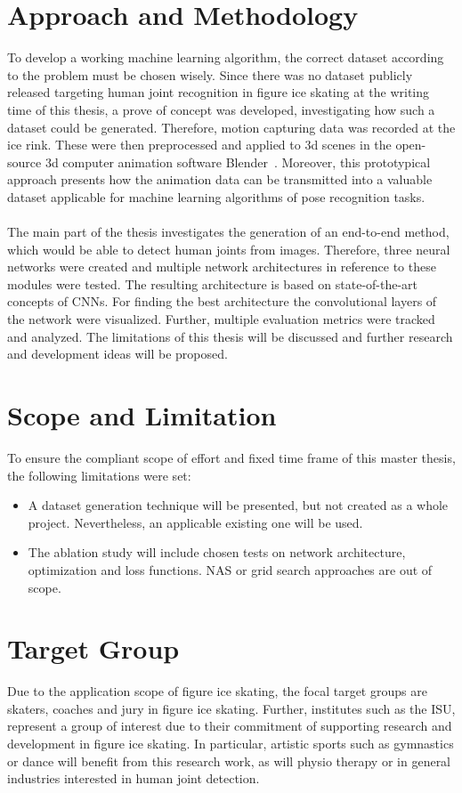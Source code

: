 \section{Approach and Methodology}
To develop a working machine learning algorithm, the correct dataset according to the problem must be chosen wisely.
Since there was no dataset publicly released targeting human joint recognition in figure ice skating at the writing time
of this thesis, a prove of concept was developed, investigating how such a dataset could be generated.
Therefore, motion capturing data was recorded at the ice rink.
These were then preprocessed and applied to 3d scenes in the open-source 3d computer animation software Blender~\cite{blender}.
Moreover, this prototypical approach presents how the animation data can be transmitted into a valuable dataset applicable for machine learning
algorithms of pose recognition tasks.
\\\mbox{}\\
The main part of the thesis investigates the generation of an end-to-end method, which would be able to detect human joints
from images.
Therefore, three neural networks were created and multiple network architectures in reference to these modules were tested.
The resulting architecture is based on state-of-the-art concepts of \glspl{CNN}.
For finding the best architecture the convolutional layers of the network were visualized.
Further, multiple evaluation metrics were tracked and analyzed.
The limitations of this thesis will be discussed and further research and development ideas will be proposed.



\section{Scope and Limitation}
\label{limitations}
To ensure the compliant scope of effort and fixed time frame of this master thesis, the following limitations were set:

\begin{itemize}
    \item A dataset generation technique will be presented, but not created as a whole project.
    Nevertheless, an applicable existing one will be used.
    \item The ablation study will include chosen tests on network architecture, optimization and loss functions.
    \gls{NAS} or grid search approaches are out of scope.
\end{itemize}
\section{Target Group}
Due to the application scope of figure ice skating, the focal target groups are skaters, coaches and jury in figure ice skating.
Further, institutes such as the \gls{ISU}, represent a group of interest due to their commitment of supporting research and development
in figure ice skating.
In particular, artistic sports such as gymnastics or dance will benefit from this research work, as will physio therapy or
in general industries interested in human joint detection.

